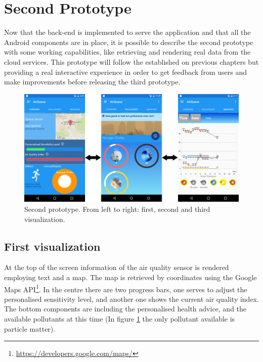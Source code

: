 \section{Second Prototype}
Now that the back-end is implemented to serve the application and that all the Android components are in place, it is possible to describe the second prototype with some working capabilities, like retrieving and rendering real data from the cloud services. This prototype will follow the established on previous chapters but providing a real interactive experience in order to get feedback from users and make improvements before releasing the third prototype. 

\begin{figure}[H]
\begin{adjustbox}{width=1.2\textwidth,center=\textwidth}
  \centering
  \includegraphics[scale=1]{images/secondPrototype.png}
\end{adjustbox}
  \caption[Second prototype]{Second prototype. From left to right: first, second and third visualization.}
  \label{fig:first_second_prototype}
\end{figure}

\subsection{First visualization}
At the top of the screen information of the air quality sensor is rendered employing text and a map. The map is retrieved by coordinates using the Google Maps API\footnote{\url{https://developers.google.com/maps/}}. In the centre there are two progress bars, one serves to adjust the personalised sensitivity level, and another one shows the current air quality index. The bottom components are including the personalised health advice, and the available pollutants at this time (In figure \ref{fig:first_second_prototype} the only pollutant available is particle matter). 

